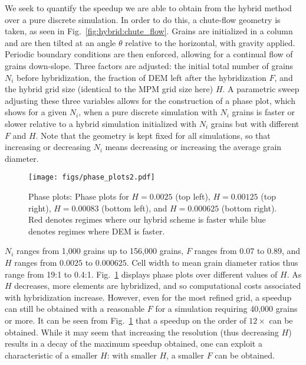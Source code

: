 We seek to quantify the speedup we are able to obtain from the hybrid
method over a pure discrete simulation. In order to do this, a chute-flow geometry is taken, as seen in
Fig.~\ref{fig:hybrid:chute_flow}. Grains are initialized in a column and are then tilted at an angle $\theta$ relative
to the horizontal, with gravity applied. Periodic boundary conditions are then enforced, allowing for a continual 
flow of grains down-slope. Three factors are adjusted: the initial total number of grains $N_i$ before hybridization, the fraction of DEM left
after the hybridization $F$, and the hybrid grid size (identical to the MPM grid size here) $H$. A parametric sweep
adjusting these three variables allows for the construction of a phase plot, which shows for a given $N_i$, when a 
pure discrete simulation with $N_i$ grains is faster or slower relative to a hybrid simulation initialized with $N_i$ grains but with
different $F$ and $H$. Note that the geometry is kept fixed for all simulations, so that increasing or decreasing $N_i$ means
decreasing or increasing the average grain diameter.

\begin{figure}
  \centering
  \texttt{[image: figs/phase\_plots2.pdf]}
  \caption{
    Phase plots: Phase plots for $H = 0.0025$ (top left), $H = 0.00125$ (top right), $H = 0.00083$ (bottom left), and $H = 0.000625$ (bottom right). Red denotes
    regimes where our hybrid scheme is faster while blue denotes regimes where DEM is faster.
  }
  \label{fig:hybrid:phase_plots}
\end{figure}

$N_i$ ranges from 1,000 grains up to 156,000 grains, $F$ ranges from $0.07$ to $0.89$, and $H$ ranges from $0.0025$ to $0.000625$. Cell width to mean grain diameter ratios thus range from 19:1 to 0.4:1.
Fig.~\ref{fig:hybrid:phase_plots} displays phase plots over different values of $H$. As $H$ decreases, more elements are hybridized, and so computational costs associated
with hybridization increase. However, even for the most refined grid, a speedup can still be obtained with a reasonable $F$ for a simulation requiring 40,000 grains or more.
It can be seen from Fig.~\ref{fig:hybrid:phase_plots} that a speedup on the order of $12\times$ can be obtained. While it may seem that increasing the resolution (thus decreasing $H$)
results in a decay of the maximum speedup obtained, one can exploit a characteristic of a smaller $H$: with smaller $H$, a smaller $F$ can be obtained.


